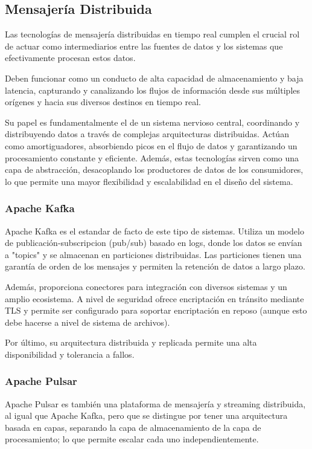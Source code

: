 \subsection{Mensajería Distribuida}

Las tecnologías de mensajería distribuidas en tiempo real cumplen el crucial rol de actuar como intermediarios entre las fuentes de datos 
y los sistemas que efectivamente procesan estos datos. \parencite{kleppmann} 

Deben funcionar como un conducto de alta capacidad de almacenamiento y baja latencia, capturando y canalizando los flujos de información
desde sus múltiples orígenes y hacia sus diversos destinos en tiempo real. \parencite{bigdata}

Su papel es fundamentalmente el de un sistema nervioso central, coordinando y distribuyendo datos a través de complejas arquitecturas distribuidas. 
Actúan como amortiguadores, absorbiendo picos en el flujo de datos y garantizando un procesamiento constante y eficiente. 
Además, estas tecnologías sirven como una capa de abstracción, desacoplando los productores de datos de los consumidores, 
lo que permite una mayor flexibilidad y escalabilidad en el diseño del sistema.

\subsubsection{Apache Kafka}
Apache Kafka es el estandar de facto de este tipo de sistemas. Utiliza un modelo de publicación-subscripcion (pub/sub) basado en logs, 
donde los datos se envían a "topics" y se almacenan en particiones distribuidas. Las particiones tienen una garantía de orden de los mensajes
y permiten la retención de datos a largo plazo.

Además, proporciona conectores para integración con diversos sistemas y un amplio ecosistema. A nivel de seguridad ofrece encriptación
en tránsito mediante TLS y permite ser configurado para soportar encriptación en reposo (aunque esto debe hacerse a nivel de sistema de archivos).

Por último, su arquitectura distribuida y replicada permite una alta disponibilidad y tolerancia a fallos.

\newpage
\subsubsection{Apache Pulsar}
Apache Pulsar es también una plataforma de mensajería y streaming distribuida, al igual que Apache Kafka, pero que se distingue por tener una 
arquitectura basada en capas, separando la capa de almacenamiento de la capa de procesamiento; lo que permite escalar cada uno independientemente.

